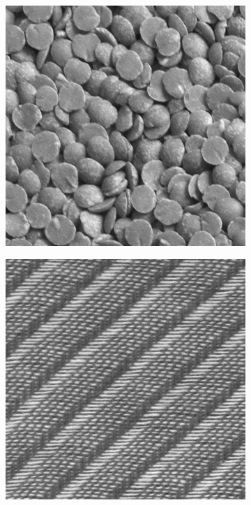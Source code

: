 \begin{figure}[h!]
\begin{subfigure}{.15\textwidth}
  \includegraphics[width=.8\linewidth]{kylberg_examples/lentils1_002.png}
\end{subfigure}
\begin{subfigure}{.15\textwidth}
  \centering
  \includegraphics[width=.8\linewidth]{kylberg_examples/screen1_002.png}
\end{subfigure}


\end{figure}
